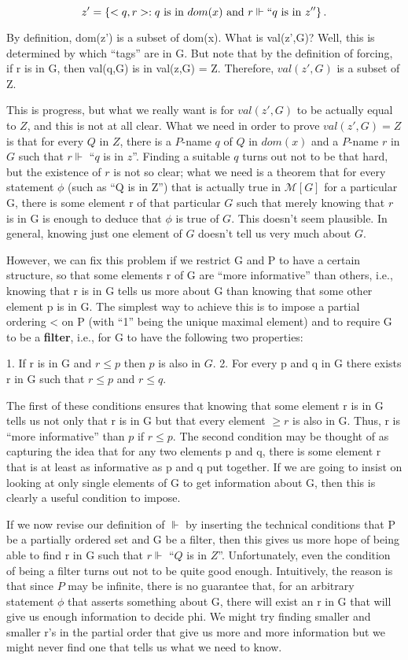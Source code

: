 \documentclass[10pt]{article}
\begin{document}
 $$z' = \left\{<q,r> : q\text{ is in }dom(x)\text{ and }r \Vdash ``q\text{ is in }z''\right\}.$$

By definition, dom(z') is a subset of dom(x). What is val(z',G)? Well, this is determined by which ``tags'' are in G. But note that by the definition of forcing, if r is in G, then val(q,G) is in val(z,G) = Z. Therefore, $val(z',G)$ is a subset of Z.

This is progress, but what we really want is for $val(z',G)$ to be actually equal to $Z$, and this is not at all clear. What we need in order to prove $val(z',G) = Z$ is that for every $Q$ in $Z$, there is a $P$-name $q$ of $Q$ in $dom(x)$ and a $P$-name $r$ in $G$ such that $r \Vdash$ ``$q$ is in $z$''. Finding a suitable $q$ turns out not to be that hard, but the existence of $r$ is not so clear; what we need is a theorem that for every statement $\phi$ (such as ``Q is in Z'') that is actually true in $\mathcal{M}[G]$ for a particular G, there is some element r of that particular $G$ such that merely knowing that $r$ is in G is enough to deduce that $\phi$ is true of $G$. This doesn't seem plausible. In general, knowing just one element of $G$ doesn't tell us very much about $G$.

However, we can fix this problem if we restrict G and P to have a certain structure, so that some elements r of G are ``more informative'' than others, i.e., knowing that r is in G tells us more about G than knowing that some other element p is in G. The simplest way to achieve this is to impose a partial ordering < on P (with ``1'' being the unique maximal element) and to require G to be a \textbf{filter}, i.e., for G to have the following two properties:

1. If r is in G and $r \leq p$ then $p$ is also in $G$.
2. For every p and q in G there exists r in G such that $r \leq p$ and $r \leq q$.

The first of these conditions ensures that knowing that some element r is in G tells us not only that r is in G but that every element $\geq r$ is also in G. Thus, r is ``more informative'' than $p$ if $r \leq p$. The second condition may be thought of as capturing the idea that for any two elements p and q, there is some element r that is at least as informative as p and q put together. If we are going to insist on looking at only single elements of G to get information about G, then this is clearly a useful condition to impose.

If we now revise our definition of $\Vdash$ by inserting the technical conditions that P be a partially ordered set and G be a filter, then this gives us more hope of being able to find r in G such that $r \Vdash$ ``$Q$ is in $Z$''. Unfortunately, even the condition of being a filter turns out not to be quite good enough. Intuitively, the reason is that since $P$ may be infinite, there is no guarantee that, for an arbitrary statement $\phi$ that asserts something about G, there will exist an r in G that will give us enough information to decide phi. We might try finding smaller and smaller r's in the partial order that give us more and more information but we might never find one that tells us what we need to know.
\end{document}
